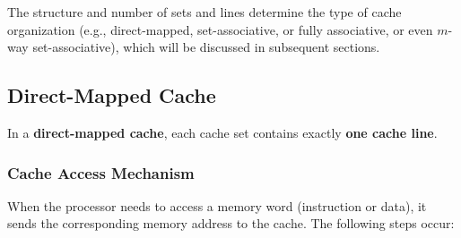 \documentclass[12pt]{book}
\begin{document}
The structure and number of sets and lines determine the type of cache organization (e.g., direct-mapped, set-associative, or fully associative, or even $m$-way set-associative), which will be discussed in subsequent sections.

\subsection*{Direct-Mapped Cache}
In a \textbf{direct-mapped cache}, each cache set contains exactly \textbf{one cache line}. 


\subsubsection*{Cache Access Mechanism}
When the processor needs to access a memory word (instruction or data), it sends the corresponding memory address to the cache. The following steps occur:
\end{document}
